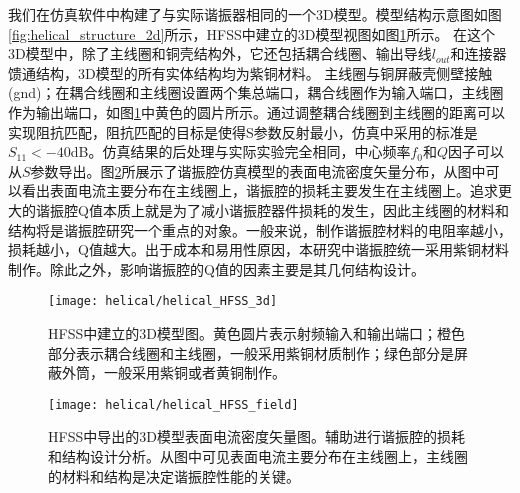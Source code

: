 我们在仿真软件中构建了与实际谐振器相同的一个3D模型。模型结构示意图如图\ref{fig:helical_structure_2d}所示，HFSS中建立的3D模型视图如图\ref{fig:helical_HFSS_3d}所示。
在这个3D模型中，除了主线圈和铜壳结构外，它还包括耦合线圈、输出导线$l_{out}$和连接器馈通结构，3D模型的所有实体结构均为紫铜材料。
主线圈与铜屏蔽壳侧壁接触(gnd)；在耦合线圈和主线圈设置两个集总端口，耦合线圈作为输入端口，主线圈作为输出端口，如图\ref{fig:helical_HFSS_3d}中黄色的圆片所示。通过调整耦合线圈到主线圈的距离可以实现阻抗匹配，阻抗匹配的目标是使得S参数反射最小，仿真中采用的标准是$S_{11}<-40$dB。仿真结果的后处理与实际实验完全相同，中心频率$f_0$和$Q$因子可以从$S$参数导出。图\ref{fig:helical_HFSS_field}所展示了谐振腔仿真模型的表面电流密度矢量分布，从图中可以看出表面电流主要分布在主线圈上，谐振腔的损耗主要发生在主线圈上。追求更大的谐振腔Q值本质上就是为了减小谐振腔器件损耗的发生，因此主线圈的材料和结构将是谐振腔研究一个重点的对象。一般来说，制作谐振腔材料的电阻率越小，损耗越小，Q值越大。出于成本和易用性原因，本研究中谐振腔统一采用紫铜材料制作。除此之外，影响谐振腔的Q值的因素主要是其几何结构设计。

\begin{figure}
    \centering
    \caption[HFSS中建立的3D模型图]{HFSS中建立的3D模型图。黄色圆片表示射频输入和输出端口；橙色部分表示耦合线圈和主线圈，一般采用紫铜材质制作；绿色部分是屏蔽外筒，一般采用紫铜或者黄铜制作。\label{fig:helical_HFSS_3d}}
    \texttt{[image: helical/helical\_HFSS\_3d]}
\end{figure}

\begin{figure}
    \centering
    \caption[HFSS中导出的3D模型表面电流密度矢量图]{HFSS中导出的3D模型表面电流密度矢量图。辅助进行谐振腔的损耗和结构设计分析。从图中可见表面电流主要分布在主线圈上，主线圈的材料和结构是决定谐振腔性能的关键。\label{fig:helical_HFSS_field}}
    \texttt{[image: helical/helical\_HFSS\_field]}
\end{figure}

